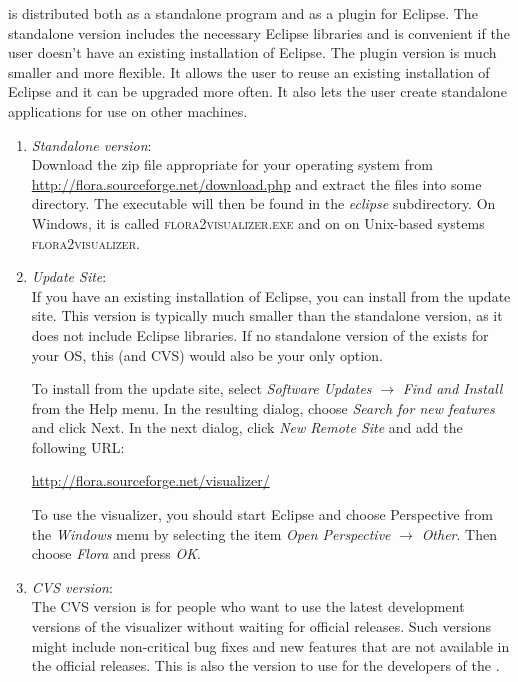 \FVIZ is distributed both as a standalone program
and as a plugin for Eclipse. The standalone version includes the necessary
Eclipse libraries and is convenient if the
user doesn't have an existing installation of Eclipse.
The plugin version is much smaller and more flexible. It allows the user
to reuse an existing installation of Eclipse and it can be upgraded more
often. It also lets the user create standalone \FVIZ applications for use
on other machines.

\begin{enumerate}
\item \emph{Standalone version}:\\
  Download the zip file appropriate for your operating system from
  \url{http://flora.sourceforge.net/download.php} and extract the files
  into some directory. The executable will then be found in the
  \emph{eclipse} subdirectory.
  On Windows, it is called \textsc{flora2visualizer.exe} and on
  on Unix-based systems \textsc{flora2visualizer}.
\item \emph{Update Site}:\\
  If you have an existing installation of Eclipse, you can install \FVIZ
  from the update site.  This version is typically much smaller than the
  standalone version, as it does not include Eclipse libraries.
  If no standalone version of the \FVIZ exists for your
  OS, this (and CVS) would also be your only option.

  To install \FVIZ from the update site, select
  \emph{Software Updates} $\rightarrow$ \emph{Find and Install} from the
  {\rm Help} menu.  In the resulting dialog, choose \emph{Search for new features} and
  click Next.  In the next dialog, click \emph{New Remote Site} and add the
  following URL:

        \url{http://flora.sourceforge.net/visualizer/}

        To use the visualizer, you should start Eclipse and choose \FVIZ
        Perspective from the \emph{Windows} menu by selecting the item
        \emph{Open Perspective} $\rightarrow$ \emph{Other}. Then choose
        \emph{Flora} and press \emph{OK}.

\item \emph{CVS version}:\\
  The CVS version is for people who want to use the latest development
  versions of the visualizer without waiting for official releases.
  Such versions might include non-critical bug fixes and new features that
  are not available in the official releases. This is also the version to
  use for the developers of the \FVIZ.


\end{enumerate}
